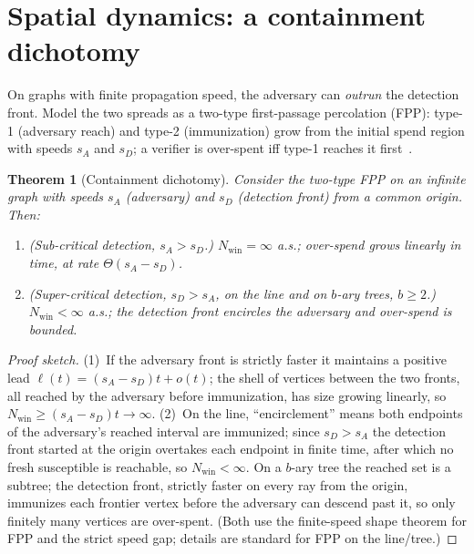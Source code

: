 \documentclass[11pt]{article}
\theoremstyle{plain}
\newtheorem{theorem}{Theorem}
\theoremstyle{definition}
\newcommand{\Nwin}{N_{\mathrm{win}}}
\begin{document}
\section{Spatial dynamics: a containment dichotomy}\label{sec:spatial}

On graphs with finite propagation speed, the adversary can \emph{outrun} the
detection front. Model the two spreads as a two-type first-passage percolation
(FPP): type-1 (adversary reach) and type-2 (immunization) grow from the initial
spend region with speeds $s_A$ and $s_D$; a verifier is over-spent iff type-1
reaches it first~\cite{HaggstromPemantle1998}.

\begin{theorem}[Containment dichotomy]\label{thm:dichotomy}
Consider the two-type FPP on an infinite graph with speeds $s_A$ (adversary) and
$s_D$ (detection front) from a common origin. Then:
\begin{enumerate}[leftmargin=1.6em,itemsep=1pt]
  \item \emph{(Sub-critical detection, $s_A>s_D$.)} $\Nwin=\infty$ a.s.; over-spend
  grows linearly in time, at rate $\Theta(s_A-s_D)$.
  \item \emph{(Super-critical detection, $s_D>s_A$, on the line and on
  $b$-ary trees, $b\ge 2$.)} $\Nwin<\infty$ a.s.; the detection front encircles
  the adversary and over-spend is bounded.
\end{enumerate}
\end{theorem}

\begin{proof}[Proof sketch]
(1)~If the adversary front is strictly faster it maintains a positive lead $\ell(t)
= (s_A-s_D)t+o(t)$; the shell of vertices between the two fronts, all reached by
the adversary before immunization, has size growing linearly, so $\Nwin\ge
(s_A-s_D)t\to\infty$.
(2)~On the line, ``encirclement'' means both endpoints of the adversary's reached
interval are immunized; since $s_D>s_A$ the detection front started at the origin
overtakes each endpoint in finite time, after which no fresh susceptible is
reachable, so $\Nwin<\infty$. On a $b$-ary tree the reached set is a subtree; the
detection front, strictly faster on every ray from the origin, immunizes each
frontier vertex before the adversary can descend past it, so only finitely many
vertices are over-spent. (Both use the finite-speed shape theorem for FPP and the
strict speed gap; details are standard for FPP on the line/tree.)
\end{proof}
\end{document}
